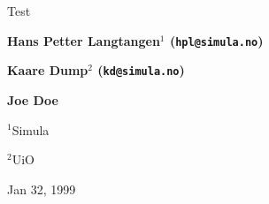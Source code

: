 \documentclass[%
oneside,                 %
final,                   %
chapterprefix=true,      %
open=right,              %
10pt]{book}
\begin{document}

\newcommand{\exercisesection}[1]{\subsection*{#1}}









\thispagestyle{empty}

\begin{center}
{\LARGE\bf
\begin{spacing}{1.25}
Test
\end{spacing}
}
\end{center}


\begin{center}
{\bf Hans Petter Langtangen${}^{1}$ (\texttt{hpl@simula.no})} \\ [0mm]
\end{center}


\begin{center}
{\bf Kaare Dump${}^{2}$ (\texttt{kd@simula.no})} \\ [0mm]
\end{center}


\begin{center}
{\bf Joe Doe${}^{}$} \\ [0mm]
\end{center}

\begin{center}
\centerline{{\small ${}^1$Simula}}
\centerline{{\small ${}^2$UiO}}
\end{center}
    

\begin{center}
Jan 32, 1999
\end{center}

\vspace{1cm}


\tableofcontents
\end{document}
